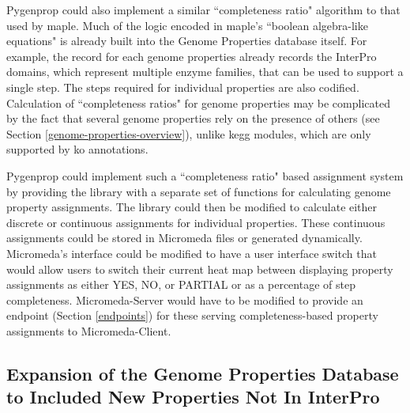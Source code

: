 Pygenprop could also implement a similar ``completeness ratio" algorithm to that 
used by \gls{maple}. Much of the logic encoded in \gls{maple}'s ``boolean 
algebra-like equations" is already built into the Genome Properties database 
itself. For example, the record for each genome properties already records the 
InterPro domains, which represent multiple enzyme families, that can be used to 
support a single step. The steps required for individual properties are also 
codified. Calculation of ``completeness ratios" for genome properties may be 
complicated by the fact that several genome properties rely on the presence of 
others (see Section \ref{genome-properties-overview}), unlike \gls{kegg} 
modules, which are only supported by \gls{ko} annotations.

Pygenprop could implement such a ``completeness ratio" based assignment system 
by providing the library with a separate set of functions for calculating genome property 
assignments. The library could then be modified to calculate either discrete or 
continuous assignments for individual properties. These continuous assignments 
could be stored in Micromeda files or generated dynamically. Micromeda's 
interface could be modified to have a user interface switch that would allow 
users to switch their current heat map between displaying property assignments 
as either YES, NO, or PARTIAL or as a percentage of step completeness. 
Micromeda-Server would have to be modified to provide an endpoint (Section 
\ref{endpoints}) for these serving completeness-based property assignments to 
Micromeda-Client.

\subsection{Expansion of the Genome Properties Database to Included New 
Properties Not In InterPro}

